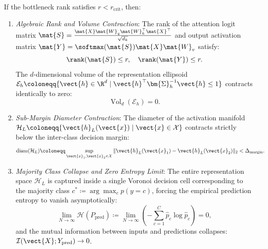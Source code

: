 \begin{theorem}
If the bottleneck rank satisfies $r < r_{\text{crit}}$, then:
\begin{enumerate}
    \item \emph{Algebraic Rank and Volume Contraction}:
    The rank of the attention logit matrix $\mat{S} = \frac{\mat{X} \mat{W}_q \mat{W}_k^\top \mat{X}^\top}{\sqrt{d_k}}$ and output activation matrix $\mat{Y} = \softmax(\mat{S}) \mat{X} \mat{W}_v$ satisfy:
    \begin{equation}
    \rank(\mat{S}) \le r, \quad \rank(\mat{Y}) \le r.
    \label{eq:sylvester_rank_consequence}
    \end{equation}
    The $d$-dimensional volume of the representation ellipsoid $\mathcal{E}_h \coloneqq \{ \vect{h} \in \R^d \mid \vect{h}^\top \bm{\Sigma}_h^{-1} \vect{h} \le 1 \}$ contracts identically to zero:
    \begin{equation}
    \operatorname{Vol}_d(\mathcal{E}_h) = 0.
    \label{app:eq:ellipsoid_volume_zero}
    \end{equation}
    \item \emph{Sub-Margin Diameter Contraction}:
    The diameter of the activation manifold $\mathcal{H}_L \coloneqq \{ \vect{h}_L(\vect{x}) \mid \vect{x} \in \mathcal{X} \}$ contracts strictly below the inter-class decision margin:
    \begin{equation}
    \operatorname{diam}(\mathcal{H}_L) \coloneqq \sup_{\vect{x}_1, \vect{x}_2 \in \mathcal{X}} \|\vect{h}_L(\vect{x}_1) - \vect{h}_L(\vect{x}_2)\|_2 < \Delta_{\text{margin}}.
    \label{app:eq:diameter_contraction_inequality}
    \end{equation}
    \item \emph{Majority Class Collapse and Zero Entropy Limit}:
    The entire representation space $\mathcal{H}_L$ is captured inside a single Voronoi decision cell corresponding to the majority class $c^* \coloneqq \arg\max_c p(y=c)$, forcing the empirical prediction entropy to vanish asymptotically:
    \begin{equation}
    \lim_{N \to \infty} \mathcal{H}(P_{\text{pred}}) \coloneqq \lim_{N \to \infty} \left( -\sum_{c=1}^C \hat{p}_c \log \hat{p}_c \right) = 0,
    \label{eq:entropy_zero_limit}
    \end{equation}
    and the mutual information between inputs and predictions collapses: $\mathcal{I}(\vect{X}; Y_{\text{pred}}) \to 0$.
\end{enumerate}
\end{theorem}

